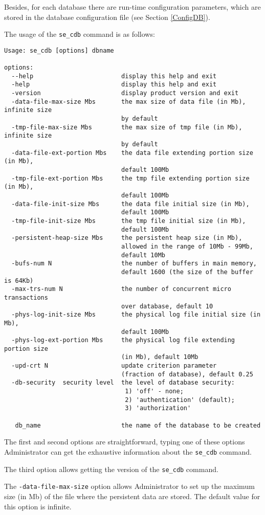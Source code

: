 \documentclass[a4paper,12pt]{article}
\begin{document}
Besides, for each database there are run-time configuration parameters, which are stored in the database configuration file (see Section \ref{ConfigDB}).

The usage of the \verb!se_cdb! command is as follows:

\begin{verbatim}
Usage: se_cdb [options] dbname

options:
  --help		 				display this help and exit
  -help							display this help and exit
  -version						display product version and exit
  -data-file-max-size Mbs		the max size of data file (in Mb), infinite size
								by default
  -tmp-file-max-size Mbs		the max size of tmp file (in Mb), infinite size
								by default
  -data-file-ext-portion Mbs	the data file extending portion size (in Mb), 
								default 100Mb
  -tmp-file-ext-portion Mbs		the tmp file extending portion size (in Mb),
								default 100Mb
  -data-file-init-size Mbs		the data file initial size (in Mb),
								default 100Mb
  -tmp-file-init-size Mbs		the tmp file initial size (in Mb),
								default 100Mb
  -persistent-heap-size Mbs		the persistent heap size (in Mb), 
								allowed in the range of 10Mb - 99Mb,
								default 10Mb
  -bufs-num N					the number of buffers in main memory,
								default 1600 (the size of the buffer is 64Kb)
  -max-trs-num N				the number of concurrent micro transactions
								over database, default 10
  -phys-log-init-size Mbs		the physical log file initial size (in Mb),
								default 100Mb
  -phys-log-ext-portion Mbs		the physical log file extending portion size 
								(in Mb), default 10Mb
  -upd-crt N					update criterion parameter 
								(fraction of database), default 0.25
  -db-security  security level  the level of database security:
								 1) 'off' - none;
								 2) 'authentication' (default);
								 3) 'authorization'
  
   db_name   					the name of the database to be created
\end{verbatim}


The first and second options are straightforward, typing one of these options Administrator can get the exhaustive information about the \verb!se_cdb! command.

The third option allows getting the version of the \verb!se_cdb! command.

The \verb!-data-file-max-size! option allows Administrator to set up the maximum size (in Mb) of the file where the persistent data are stored. The default value for this option is infinite.
\end{document}

